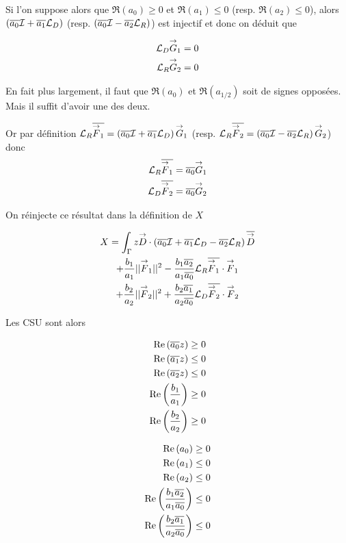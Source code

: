   Si l'on suppose alors que \(\Re(a_0) \ge 0 \) et \(\Re(a_1) \le 0\) (resp. \(\Re(a_2)\le0\)), alors \(\left(\conj{a_0} \oI + \conj{a_1} \LD \right)\) (resp. \(\left(\conj{a_0} \oI - \conj{a_2} \LR \right)\)) est injectif et donc on déduit que 

  \begin{align}
    \LD\vG_1 = 0
    \\
    \LR\vG_2 = 0
  \end{align}

\begin{TODO}
  En fait plus largement, il faut que \(\Re(a_0)\) et \(\Re(a_{1/2})\) soit de signes opposées. Mais il suffit d'avoir une des deux.
\end{TODO}

  Or par définition \(\LR\conj{\vF_1} = \left(\conj{a_0} \oI + \conj{a_1} \LD \right)\vG_1\) (resp. \(\LR\conj{\vF_2} = \left(\conj{a_0} \oI - \conj{a_2} \LR \right)\vG_2\)) donc
  \begin{align}
    \LR\conj{\vF_1} &= \conj{a_0}\vG_1
    \\
    \LD\conj{\vF_2} &= \conj{a_0}\vG_2    
  \end{align}

  On réinjecte ce résultat dans la définition de \(X\)

  \begin{multline}
    X = \int_\Gamma z \vD \cdot \left(\conj{a_0} \oI + \conj{a_1} \LD - \conj{a_2}\LR\right)\conj{\vD}
    \\
    + \frac{b_1}{a_1} ||\vF_1||^2 - \frac{b_1\conj{a_2}}{a_1\conj{a_0}} \LR\conj{\vF_1}\cdot\vF_1
    \\
    + \frac{b_2}{a_2} ||\vF_2||^2 + \frac{b_2\conj{a_1}}{a_2\conj{a_0}} \LD\conj{\vF_2}\cdot\vF_2
  \end{multline}

  Les CSU sont alors

  \begin{minipage}{0.5\textwidth}
  \begin{align}
    \Re\left(\conj{a_0}z\right) \ge 0
    \\
    \Re\left(\conj{a_1}z\right) \le 0
    \\
    \Re\left(\conj{a_2}z\right) \le 0
    \\
    \Re\left(\frac{b_1}{a_1}\right) \ge 0
    \\
    \Re\left(\frac{b_2}{a_2}\right) \ge 0
  \end{align}
  \end{minipage}
  \begin{minipage}{0.49\textwidth}
  \begin{align}
    \Re\left(a_0\right) \ge 0
    \\
    \Re\left(a_1\right) \le 0
    \\
    \Re\left(a_2\right) \le 0
    \\
    \Re\left(\frac{b_1\conj{a_2}}{a_1\conj{a_0}}\right) \le 0
    \\
    \Re\left(\frac{b_2\conj{a_1}}{a_2\conj{a_0}}\right) \le 0
  \end{align}
  \end{minipage}